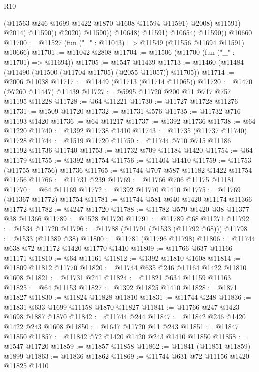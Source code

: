 \begin{lexlean}{R10}
\begin{coremodule}
                              (@11563 @246 @1699 @1422 @1870 @1608 @11594 @11591)
                              @2008)
                            @11591)
                          @2014)
                        @11590))
                    @2020)
                  @11590))
              @10648)
            @11591)
          @10654)
        @11590))
    @10660
@11700 := @11527 (fun ("_" : @11043) => @11549 (@11556 @11694 @11591) @10666)
@11701 := @11042 @2808
@11704 := @11506 (@11700 (fun ("_" : @11701) => @11694))
@11705 := @1547 @11439
@11713 := @11460 (@11484 (@11490 (@11500 (@11704 @11705) (@2055 @11057)) @11705))
@11714 := @2006 @11038
@11717 := @11449 (@11713 (@11714 @11065))
@11720 := @1470 (@7260 @11447) @11439
@11727 := @5995 @11720 @200 @11 @717 @757 @11195 @11228
@11728 := @64 @11221
@11730 := @11727 @11728 @11276
@11731 := @1509 @11720
@11732 := @11731 @576
@11735 := @11732 @716 @11193 @1420
@11736 := @64 @11217
@11737 := @1392 @11736
@11738 := @64 @11220
@11740 := @1392 @11738 @1410
@11743 := @11735 (@11737 @11740) @11728
@11744 := @1519 @11720
@11750 := @11744 @710 @715 @11186 @11192 @11736 @11740
@11753 := @11732 @709 @11184 @1420
@11754 := @64 @11179
@11755 := @1392 @11754
@11756 := @11404 @1410
@11759 := @11753 (@11755 @11756) @11736
@11765 := @11744 @707 @587 @11182 @1422 @11754 @11756
@11766 := @11731 @239
@11769 := @11766 @706 @11175 @11181
@11770 := @64 @11169
@11772 := @1392 @11770 @1410
@11775 := @11769 (@11367 @11772) @11754
@11781 := @11744 @581 @640 @1420 @11174 @11366 @11772
@11782 := @4247 @11720
@11788 := @11782 @579 @1420 @38 @11377 @38 @11366
@11789 := @1528 @11720
@11791 := @11789 @68 @11271
@11792 := @1534 @11720
@11796 := @11788 (@11791 (@1533 (@11792 @68)))
@11798 := @1533 (@11389 @38)
@11800 := @11781 (@11796 @11798)
@11806 := @11744 @638 @72 @11172 @1420 @11770 @1410
@11809 := @11766 @637 @11166 @11171
@11810 := @64 @11161
@11812 := @1392 @11810 @1608
@11814 := @11809 @11812 @11770
@11820 := @11744 @635 @246 @11164 @1422 @11810 @1608
@11821 := @11731 @241
@11824 := @11821 @634 @11159 @11163
@11825 := @64 @11153
@11827 := @1392 @11825 @1410
@11828 := @1871 @11827
@11830 := @11824 @11828 @11810
@11831 := @11744 @248
@11836 := @11831 @633 @1699 @11158 @1870 @11827
@11841 := @11766 @247 @1423 @1698 @1887 @1870
@11842 := @11744 @244
@11847 := @11842 @246 @1420 @1422 @243 @1608
@11850 := @1647 @11720 @11 @243
@11851 := @11847 @11850
@11857 := @11842 @72 @1420 @1420 @243 @1410 @11850
@11858 := @1547 @11720
@11859 := @11857 @11858
@11862 := @11841 (@11851 @11859) @1899
@11863 := @11836 @11862
@11869 := @11744 @631 @72 @11156 @1420 @11825 @1410

\end{coremodule}
\end{lexlean}
